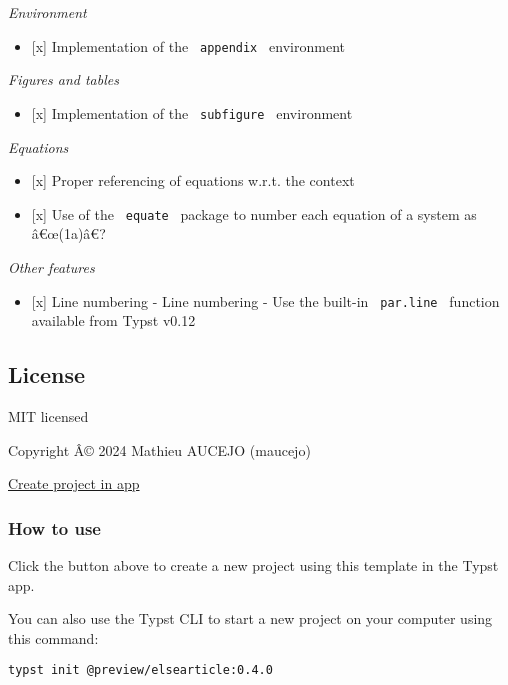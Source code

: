 \emph{Environment}

\begin{itemize}
\tightlist
\item
  {[}x{]} Implementation of the \texttt{\ appendix\ } environment
\end{itemize}

\emph{Figures and tables}

\begin{itemize}
\tightlist
\item
  {[}x{]} Implementation of the \texttt{\ subfigure\ } environment
\end{itemize}

\emph{Equations}

\begin{itemize}
\tightlist
\item
  {[}x{]} Proper referencing of equations w.r.t. the context
\item
  {[}x{]} Use of the \texttt{\ equate\ } package to number each equation
  of a system as â€œ(1a)â€?
\end{itemize}

\emph{Other features}

\begin{itemize}
\tightlist
\item
  {[}x{]} Line numbering - Line numbering - Use the built-in
  \texttt{\ par.line\ } function available from Typst v0.12
\end{itemize}

\subsection{License}\label{license}

MIT licensed

Copyright Â© 2024 Mathieu AUCEJO (maucejo)

\href{/app?template=elsearticle&version=0.4.0}{Create project in app}

\subsubsection{How to use}\label{how-to-use}

Click the button above to create a new project using this template in
the Typst app.

You can also use the Typst CLI to start a new project on your computer
using this command:

\begin{verbatim}
typst init @preview/elsearticle:0.4.0
\end{verbatim}

